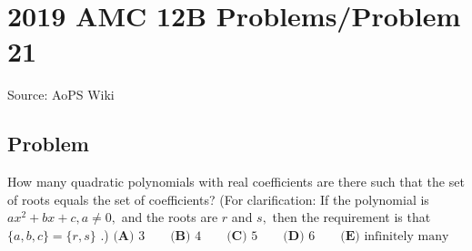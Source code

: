 \documentclass[12pt]{article}
\begin{document}
\section*{{2019 AMC 12B Problems/Problem 21}}
Source: AoPS Wiki

\subsection*{Problem}
How many quadratic polynomials with real coefficients are there such that the set of roots equals the set of coefficients? (For clarification: If the polynomial is $ax^2+bx+c,a\neq 0,$ and the roots are $r$ and $s,$ then the requirement is that $\{a,b,c\}=\{r,s\}$ .) $\textbf{(A) } 3 \qquad\textbf{(B) } 4 \qquad\textbf{(C) } 5 \qquad\textbf{(D) } 6 \qquad\textbf{(E) } \text{infinitely many}$
\end{document}
